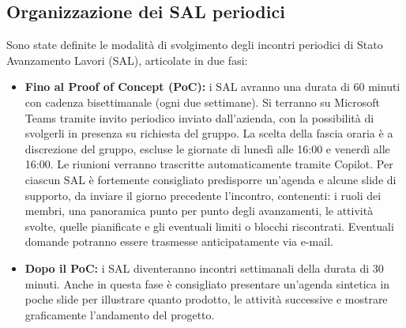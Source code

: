 \documentclass[11pt, a4paper]{article}
\begin{document}
\subsection{Organizzazione dei SAL periodici}
Sono state definite le modalità di svolgimento degli incontri periodici di Stato Avanzamento Lavori (SAL), articolate in due fasi:
\begin{itemize}
    \item \textbf{Fino al Proof of Concept (PoC):} i SAL avranno una durata di 60 minuti con cadenza bisettimanale (ogni due settimane). Si terranno su Microsoft Teams tramite invito periodico inviato dall'azienda, con la possibilità di svolgerli in presenza su richiesta del gruppo. La scelta della fascia oraria è a discrezione del gruppo, escluse le giornate di lunedì alle 16:00 e venerdì alle 16:00. Le riunioni verranno trascritte automaticamente tramite Copilot. Per ciascun SAL è fortemente consigliato predisporre un'agenda e alcune slide di supporto, da inviare il giorno precedente l'incontro, contenenti: i ruoli dei membri, una panoramica punto per punto degli avanzamenti, le attività svolte, quelle pianificate e gli eventuali limiti o blocchi riscontrati. Eventuali domande potranno essere trasmesse anticipatamente via e-mail.
    \item \textbf{Dopo il PoC:} i SAL diventeranno incontri settimanali della durata di 30 minuti. Anche in questa fase è consigliato presentare un'agenda sintetica in poche slide per illustrare quanto prodotto, le attività successive e mostrare graficamente l'andamento del progetto.
\end{itemize}
\end{document}
